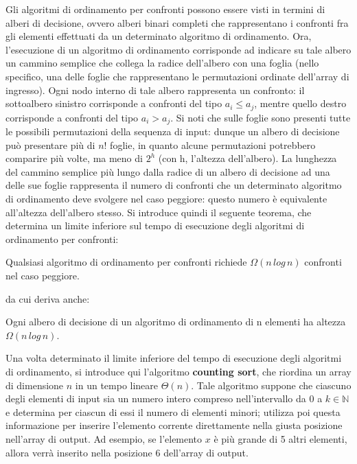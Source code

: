Gli algoritmi di ordinamento per confronti possono essere visti in termini di alberi di decisione, ovvero alberi binari completi che rappresentano i confronti fra gli elementi effettuati da un determinato algoritmo di ordinamento. Ora, l'esecuzione di un algoritmo di ordinamento corrisponde ad indicare su tale albero un cammino semplice che collega la radice dell'albero con una foglia (nello specifico, una delle foglie che rappresentano le permutazioni ordinate dell'array di ingresso). Ogni nodo interno di tale albero rappresenta un confronto: il sottoalbero sinistro corrisponde a confronti del tipo \(a_i \le a_j\), mentre quello destro corrisponde a confronti del tipo \(a_i > a_j\). Si noti che sulle foglie sono presenti tutte le possibili permutazioni della sequenza di input: dunque un albero di decisione può presentare più di \(n!\) foglie, in quanto alcune permutazioni potrebbero comparire più volte, ma meno di \(2^h\) (con h, l'altezza dell'albero). La lunghezza del cammino semplice più lungo dalla radice di un albero di decisione ad una delle sue foglie rappresenta il numero di confronti che un determinato algoritmo di ordinamento deve svolgere nel caso peggiore: questo numero è equivalente all'altezza dell'albero stesso. Si introduce quindi il seguente teorema, che determina un limite inferiore sul tempo di esecuzione degli algoritmi di ordinamento per confronti:

\begin{theorem}
  Qualsiasi algoritmo di ordinamento per confronti richiede \(\Omega(n\,log\,n)\) confronti nel caso peggiore.
\end{theorem}

\noindent
da cui deriva anche:

\begin{theorem}
  Ogni albero di decisione di un algoritmo di ordinamento di n elementi ha altezza \(\Omega(n\,log\,n)\).
\end{theorem}

\vspace*{10pt}

Una volta determinato il limite inferiore del tempo di esecuzione degli algoritmi di ordinamento, si introduce qui l'algoritmo \textbf{counting sort}, che riordina un array di dimensione \(n\) in un tempo lineare \(\Theta(n)\). 
Tale algoritmo suppone che ciascuno degli elementi di input sia un numero intero compreso nell'intervallo da 0 a \(k\in \mathbb{N}\) e determina per ciascun di essi il numero di elementi minori; utilizza poi questa informazione per inserire l'elemento corrente direttamente nella giusta posizione nell'array di output. Ad esempio, se l'elemento \(x\) è più grande di 5 altri elementi, allora verrà inserito nella posizione 6 dell'array di output.

